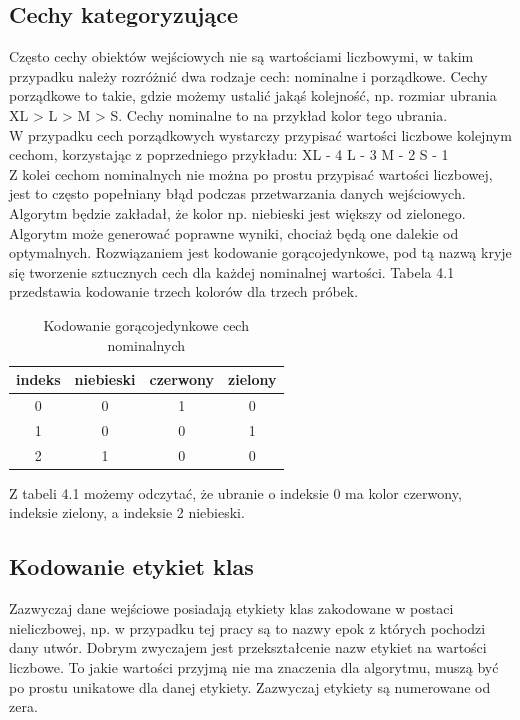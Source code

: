 \documentclass[printmode, eng, openany]{mgr}
\newcommand\tab[1][1cm]{\hspace*{#1}}
\begin{document}
\subsection{Cechy kategoryzujące}
\tab Często cechy obiektów wejściowych nie są wartościami liczbowymi, w takim przypadku należy rozróżnić dwa rodzaje cech: nominalne i porządkowe. Cechy porządkowe to takie, gdzie możemy ustalić jakąś kolejność, np. rozmiar ubrania XL > L > M > S. Cechy nominalne to na przykład kolor tego ubrania.\\
\tab W przypadku cech porządkowych wystarczy przypisać wartości liczbowe kolejnym cechom, korzystając z poprzedniego przykładu:
XL - 4
L - 3
M - 2
S - 1\\
\tab Z kolei cechom nominalnych nie można po prostu przypisać wartości liczbowej, jest to często popełniany błąd podczas przetwarzania danych wejściowych. Algorytm będzie zakładał, że kolor np. niebieski jest większy od zielonego. Algorytm może generować poprawne wyniki, chociaż będą one dalekie od optymalnych. Rozwiązaniem jest kodowanie gorącojedynkowe, pod tą nazwą kryje się tworzenie sztucznych cech dla każdej nominalnej wartości. Tabela 4.1 przedstawia kodowanie trzech kolorów dla trzech próbek.
\begin{table}[H]
\centering
\caption{Kodowanie gorącojedynkowe cech nominalnych}
\begin{tabular}{c|c|c|c}

indeks & niebieski & czerwony & zielony \\
\hline
0 & 0 & 1 & 0 \\
\hline
1 & 0 & 0 & 1 \\
\hline
2 & 1 & 0 & 0 \\

\end{tabular}
\end{table}
Z tabeli 4.1 możemy odczytać, że ubranie o indeksie 0 ma kolor czerwony, indeksie zielony, a indeksie 2 niebieski.
\subsection{Kodowanie etykiet klas}
\tab Zazwyczaj dane wejściowe posiadają etykiety klas zakodowane w postaci nieliczbowej, np. w przypadku tej pracy są to nazwy epok z których pochodzi dany utwór. Dobrym zwyczajem jest przekształcenie nazw etykiet na wartości liczbowe. To jakie wartości przyjmą nie ma znaczenia dla algorytmu, muszą być po prostu unikatowe dla danej etykiety. Zazwyczaj etykiety są numerowane od zera. 
\end{document}
